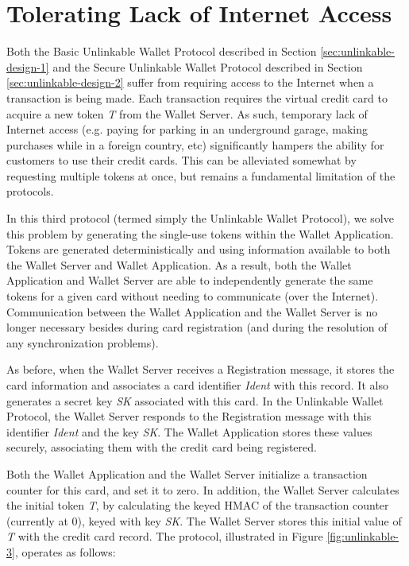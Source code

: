 \section{Tolerating Lack of Internet Access}
\label{unlinkable-design-3}

Both the Basic Unlinkable Wallet Protocol described in Section \ref{sec:unlinkable-design-1}
    and the Secure Unlinkable Wallet Protocol described in Section \ref{sec:unlinkable-design-2}
    suffer from requiring access to the Internet when a transaction is being made.
Each transaction requires the virtual credit card to acquire a new token \emph{T} from the Wallet Server.
As such, temporary lack of Internet access
    (e.g. paying for parking in an underground garage, making purchases while in a foreign country, etc)
    significantly hampers the ability for customers to use their credit cards.
This can be alleviated somewhat by requesting multiple tokens at once, but remains a fundamental limitation of the protocols.

In this third protocol (termed simply the Unlinkable Wallet Protocol), we solve this problem by generating the single-use tokens within the Wallet Application.
Tokens are generated deterministically and using information available to both the Wallet Server and Wallet Application.
As a result, both the Wallet Application and Wallet Server are able to independently generate the same tokens for a given card without needing to communicate
    (over the Internet).
Communication between the Wallet Application and the Wallet Server is no longer necessary besides during card registration (and during the resolution of any synchronization problems).

As before, when the Wallet Server receives a Registration message, it stores the card information and associates a card identifier \emph{Ident} with this record.
It also generates a secret key \emph{SK} associated with this card.
In the Unlinkable Wallet Protocol, the Wallet Server responds to the Registration message with this identifier \emph{Ident} and the key \emph{SK}.
The Wallet Application stores these values securely, associating them with the credit card being registered.

Both the Wallet Application and the Wallet Server initialize a transaction counter for this card, and set it to zero.
In addition, the Wallet Server calculates the initial token \emph{T}, by calculating the keyed HMAC of the transaction counter (currently at 0), keyed with key \emph{SK}.
The Wallet Server stores this initial value of \emph{T} with the credit card record.
The protocol, illustrated in Figure \ref{fig:unlinkable-3}, operates as follows:

